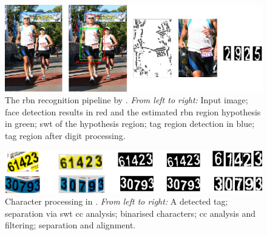 \begin{figure}[h]
  \centering
  \includegraphics[width=\textwidth]{images/background/benami2012_pipeline}
  \caption[Text recognition pipelines dependent on heuristics]{The \gls{rbn} recognition pipeline by \citet{Benami:2012jf}. \textit{From left to right:} Input image; face detection results in red and the estimated \gls{rbn} region hypothesis in green; \gls{swt} of the hypothesis region; tag region detection in blue; tag region after digit processing.}
  \label{fig:background:recognition:benami2012_pipeline}
\end{figure}

\vspace*{\fill}

\begin{figure}[p]
  \centering
  \includegraphics[width=\textwidth]{images/background/benami2012_cctags}
  \caption[Character processing for feeding an OCR engine]{Character processing in \citep{Benami:2012jf}. \textit{From left to right:} A detected tag; separation via \gls{swt} \gls{cc} analysis; binarised characters; \gls{cc} analysis and filtering; separation and alignment.}
  \label{fig:background:recognition:benami2012_cctags}
\end{figure}

